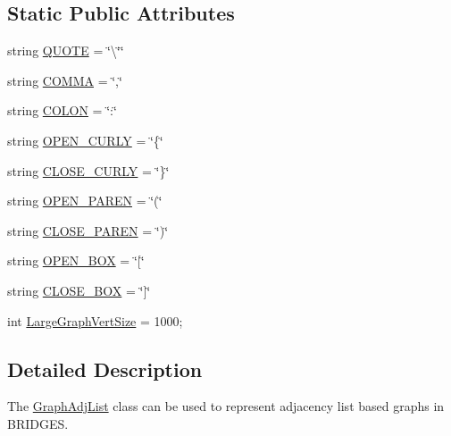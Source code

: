 \subsection*{Static Public Attributes}
\begin{DoxyCompactItemize}
\item 
string \mbox{\hyperlink{classbridges_1_1graph__adj__list_1_1_graph_adj_list_a57d3be43c5cd9a2895e2d2ef716b40c8}{Q\+U\+O\+TE}} = \char`\"{}\textbackslash{}\char`\"{}\char`\"{}
\item 
string \mbox{\hyperlink{classbridges_1_1graph__adj__list_1_1_graph_adj_list_a5919579cbd6ab68e90382b94eb187f41}{C\+O\+M\+MA}} = \char`\"{},\char`\"{}
\item 
string \mbox{\hyperlink{classbridges_1_1graph__adj__list_1_1_graph_adj_list_a58164deb88de4720214191dfd5b820ca}{C\+O\+L\+ON}} = \char`\"{}\+:\char`\"{}
\item 
string \mbox{\hyperlink{classbridges_1_1graph__adj__list_1_1_graph_adj_list_a67b27b322df909d7d5dccfb5d7a5372c}{O\+P\+E\+N\+\_\+\+C\+U\+R\+LY}} = \char`\"{}\{\char`\"{}
\item 
string \mbox{\hyperlink{classbridges_1_1graph__adj__list_1_1_graph_adj_list_a18a58cd61145751d9a9f546e16cf5e07}{C\+L\+O\+S\+E\+\_\+\+C\+U\+R\+LY}} = \char`\"{}\}\char`\"{}
\item 
string \mbox{\hyperlink{classbridges_1_1graph__adj__list_1_1_graph_adj_list_af3ebf5a87fb8c6a84d18b6865b7cbcc2}{O\+P\+E\+N\+\_\+\+P\+A\+R\+EN}} = \char`\"{}(\char`\"{}
\item 
string \mbox{\hyperlink{classbridges_1_1graph__adj__list_1_1_graph_adj_list_a01e7f18cb606a87dd909447f994667fb}{C\+L\+O\+S\+E\+\_\+\+P\+A\+R\+EN}} = \char`\"{})\char`\"{}
\item 
string \mbox{\hyperlink{classbridges_1_1graph__adj__list_1_1_graph_adj_list_ad87a298f9ff9d800a47bdc64d5dd0034}{O\+P\+E\+N\+\_\+\+B\+OX}} = \char`\"{}\mbox{[}\char`\"{}
\item 
string \mbox{\hyperlink{classbridges_1_1graph__adj__list_1_1_graph_adj_list_a67e1cbb2c7167cd5c87e23882ce364e7}{C\+L\+O\+S\+E\+\_\+\+B\+OX}} = \char`\"{}\mbox{]}\char`\"{}
\item 
int \mbox{\hyperlink{classbridges_1_1graph__adj__list_1_1_graph_adj_list_a093a64ead793e0bd3b1ce4e3456665c9}{Large\+Graph\+Vert\+Size}} = 1000;
\end{DoxyCompactItemize}


\subsection{Detailed Description}
The \mbox{\hyperlink{classbridges_1_1graph__adj__list_1_1_graph_adj_list}{Graph\+Adj\+List}} class can be used to represent adjacency list based graphs in B\+R\+I\+D\+G\+ES. 

